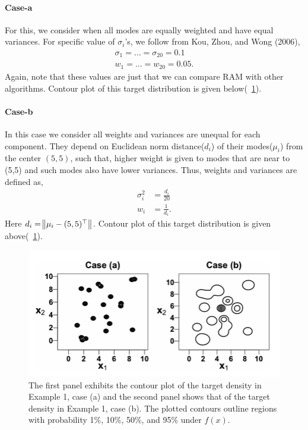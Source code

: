 \documentclass{article}
\begin{document}
\paragraph{Case-a}
For this, we consider when all modes are equally weighted and have equal variances. For specific value of $\sigma_i$'s, we follow from Kou, Zhou, and Wong (2006),
\begin{align*}
    \sigma_1=\ldots=\sigma_{20}=0.1\\
    w_1=\ldots=w_{20}=0.05.
\end{align*}
Again, note that these values are just that we can compare RAM with other algorithms. Contour plot of this target distribution is given below(~\ref{fig:exa1.2}).

\paragraph{Case-b}
In this case we consider all weights and variances are unequal for each component. They depend on Euclidean norm distance($d_i$) of their modes($\mu_i$) from the center $(5,5)$, such that, higher weight is given to modes that are near to (5,5) and such modes also have lower variances. Thus, weights and variances are defined as,
\begin{align*}
    \sigma_i^2 &=\frac{d_i}{20}\\
    w_i &=\frac{1}{d_i}.
\end{align*}
Here $d_i=\norm{\mu_i -(5,5)^\top}$. Contour plot of this target distribution is given above(~\ref{fig:exa1.2}).
\begin{figure}
    \centering
    \includegraphics[width=\textwidth]{exa-1-point-plot.png}
    \caption{The first panel exhibits the contour plot of the target density in Example 1,
case (a) and the second panel shows that of the target density in Example 1, case (b).
The plotted contours outline regions with probability 1\%, 10\%, 50\%, and 95\% under
$f (x)$.
}
    \label{fig:exa1.2}
\end{figure}
\end{document}
